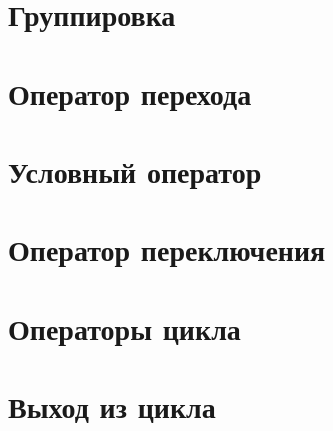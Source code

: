 \documentclass[book.tex]{subfiles}
\begin{document}



\maketitle 

\section*{Группировка}

\section*{Оператор перехода}

\section*{Условный оператор}

\section*{Оператор переключения}

\section*{Операторы цикла}

\section*{Выход из цикла}
\end{document}
